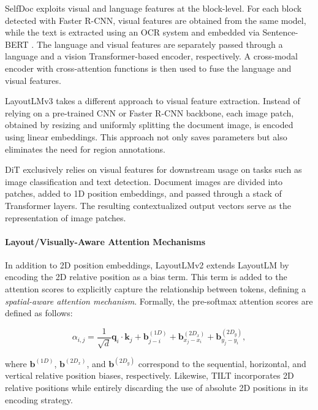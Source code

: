 SelfDoc \citep{li2021selfdoc} exploits visual and language features at the block-level. For each block detected with Faster R-CNN, visual features are obtained from the same model, while the text is extracted using an \ac{OCR} system and embedded via Sentence-BERT \citep{reimers2019sentence}. The language and visual features are separately passed through a language and a vision Transformer-based encoder, respectively. A cross-modal encoder with cross-attention functions is then used to fuse the language and visual features.  

LayoutLMv3 \citep{huang2022layoutlmv3} takes a different approach to visual feature extraction. Instead of relying on a pre-trained \ac{CNN} or Faster R-CNN backbone, each image patch, obtained by resizing and uniformly splitting the document image, is encoded using linear embeddings. This approach not only saves parameters but also eliminates the need for region annotations.

\ac{DiT} \citep{li2022dit} exclusively relies on visual features for downstream usage on tasks such as image classification and text detection. Document images are divided into patches, added to 1D position embeddings, and passed through a stack of Transformer layers. The resulting contextualized output vectors serve as the representation of image patches.

\paragraph{Layout/Visually-Aware Attention Mechanisms}

In addition to 2D position embeddings, LayoutLMv2 \citep{xu2020layoutlmv2} extends LayoutLM by encoding the 2D relative position as a bias term. This term is added to the attention scores to explicitly capture the relationship between tokens, defining a \textit{spatial-aware attention mechanism}. Formally, the pre-softmax attention scores are defined as follows:

\begin{equation}
    \alpha_{i,j} = \dfrac{1}{\sqrt{d}} \bm{q}_i \cdot \bm{k}_j + \bm{b}^{(1D)}_{j - i} + \bm{b}^{(2D_x)}_{x_j - x_i} + \bm{b}^{(2D_y)}_{y_j - y_i},
\end{equation}

\noindent where $\bm{b}^{(1D)}$, $\bm{b}^{(2D_x)}$, and $\bm{b}^{(2D_y)}$ correspond to the sequential, horizontal, and vertical relative position biases, respectively. Likewise, TILT \citep{powalski2021going} incorporates 2D relative positions while entirely discarding the use of absolute 2D positions in its encoding strategy. 

